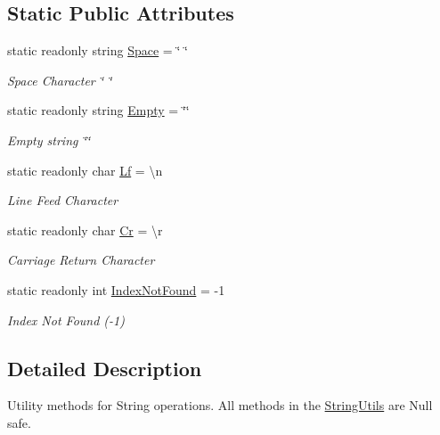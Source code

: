 \subsection*{Static Public Attributes}
\begin{DoxyCompactItemize}
\item 
static readonly string \hyperlink{class_ultimate_1_1_utilities_1_1_string_utils_aaf14285c5b759cf235930277a92fc3b4}{Space} = \char`\"{} \char`\"{}
\begin{DoxyCompactList}\small\item\em Space Character \char`\"{} \char`\"{} \end{DoxyCompactList}\item 
static readonly string \hyperlink{class_ultimate_1_1_utilities_1_1_string_utils_a9b3c4479543bf534b42010d42af2ebb9}{Empty} = \char`\"{}\char`\"{}
\begin{DoxyCompactList}\small\item\em Empty string \char`\"{}\char`\"{} \end{DoxyCompactList}\item 
static readonly char \hyperlink{class_ultimate_1_1_utilities_1_1_string_utils_a2be81a54a2550214757c0d0931520bed}{Lf} = \textquotesingle{}\textbackslash{}n\textquotesingle{}
\begin{DoxyCompactList}\small\item\em Line Feed Character \textquotesingle{}~\newline
\textquotesingle{} \end{DoxyCompactList}\item 
static readonly char \hyperlink{class_ultimate_1_1_utilities_1_1_string_utils_a78aa786db97cecae97f94db472dc1c38}{Cr} = \textquotesingle{}\textbackslash{}r\textquotesingle{}
\begin{DoxyCompactList}\small\item\em Carriage Return Character \textquotesingle{}\textquotesingle{} \end{DoxyCompactList}\item 
static readonly int \hyperlink{class_ultimate_1_1_utilities_1_1_string_utils_a0ea1f1d056068a2c8014715eb30c5c33}{Index\+Not\+Found} = -\/1
\begin{DoxyCompactList}\small\item\em Index Not Found (-\/1) \end{DoxyCompactList}\end{DoxyCompactItemize}


\subsection{Detailed Description}
Utility methods for String operations. All methods in the \hyperlink{class_ultimate_1_1_utilities_1_1_string_utils}{String\+Utils} are Null safe. 



